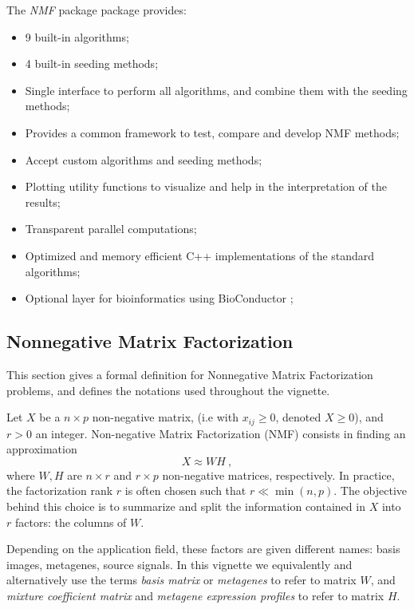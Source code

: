 \documentclass[a4paper]{article}\usepackage{graphicx, color}
\newcommand{\pkgname}[1]{\textit{#1}\xspace}
\newcommand{\Rpkg}[1]{\pkgname{#1} package\xspace}
\newcommand{\nmfpack}{\Rpkg{NMF}}
\renewcommand{\cite}[1]{\parencite{#1}}
\begin{document}
The \nmfpack package provides:
\begin{itemize}
\item 9 built-in algorithms;
\item 4 built-in seeding methods;
\item Single interface to perform all algorithms, and combine them with the seeding methods;
\item Provides a common framework to test, compare and develop NMF methods;
\item Accept custom algorithms and seeding methods;
\item Plotting utility functions to visualize and help in the interpretation of the results;
\item Transparent parallel computations;
\item Optimized and memory efficient C++ implementations of the standard algorithms;
\item Optional layer for bioinformatics using BioConductor \cite{Gentleman2004};
\end{itemize}

\subsection{Nonnegative Matrix Factorization}

This section gives a formal definition for Nonnegative Matrix Factorization problems, and defines the notations used throughout the vignette. 

Let $X$ be a $n \times p$ non-negative matrix, (i.e with $x_{ij} \geq 0$,
denoted $X \geq 0$), and $r > 0$ an integer. Non-negative Matrix Factorization (NMF) consists in finding an approximation
\begin{equation}
X \approx W H\ , \label{NMFstd}
\end{equation}
where $W, H$ are $n\times r$ and $r \times p$ non-negative matrices, respectively. 
In practice, the factorization rank $r$ is often chosen such that $r \ll \min(n, p)$. 
The objective behind this choice is to summarize and split the information contained in $X$ into $r$ factors: the columns of $W$. 

Depending on the application field, these factors are given different names: basis images, metagenes, source signals. In this vignette we equivalently and alternatively use the terms 
\emph{basis matrix} or \emph{metagenes} to refer to matrix $W$, and \emph{mixture coefficient matrix} and \emph{metagene expression profiles} to refer to matrix $H$.
\end{document}
